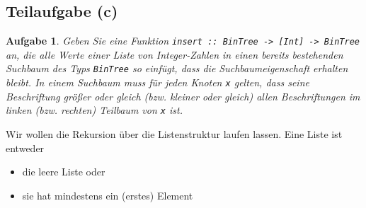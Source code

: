 \documentclass[ngerman, a4paper, 11pt]{article}
\theoremstyle{nonumberplain}
\newtheorem{aufgabe}{Aufgabe}
\begin{document}
\subsection*{Teilaufgabe (c)}

\begin{aufgabe}
	Geben Sie eine Funktion \texttt{insert :: BinTree -> [Int] -> BinTree} an, die alle Werte einer Liste von Integer-Zahlen in einen bereits bestehenden Suchbaum des Typs \texttt{BinTree} so einfügt, dass die Suchbaumeigenschaft erhalten bleibt. In einem Suchbaum muss für jeden Knoten \texttt{x} gelten, dass seine Beschriftung größer oder gleich (bzw. kleiner oder gleich) allen
	Beschriftungen im linken (bzw. rechten) Teilbaum von \texttt{x} ist.
\end{aufgabe}

Wir wollen die Rekursion über die Listenstruktur laufen lassen. Eine Liste ist entweder
\begin{itemize}[nolistsep, topsep=-\parskip]
	\item die leere Liste oder
	\item sie hat mindestens ein (erstes) Element
\end{itemize}
\end{document}
